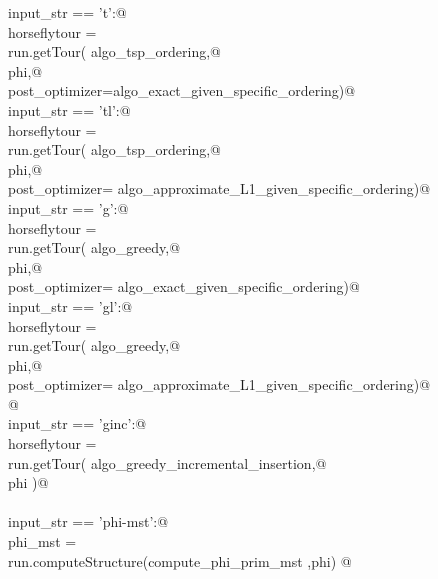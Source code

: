 \documentclass[11.5pt]{report}
\begin{document}
\begin{flushleft}
\begin{list}{}{}
\mbox{}\verb@elif input_str == 't':@\\
\mbox{}\verb@      horseflytour = \@\\
\mbox{}\verb@             run.getTour( algo_tsp_ordering,@\\
\mbox{}\verb@                          phi,@\\
\mbox{}\verb@                          post_optimizer=algo_exact_given_specific_ordering)@\\
\mbox{}\verb@elif input_str == 'tl':@\\
\mbox{}\verb@      horseflytour = \@\\
\mbox{}\verb@             run.getTour( algo_tsp_ordering,@\\
\mbox{}\verb@                          phi,@\\
\mbox{}\verb@                          post_optimizer= algo_approximate_L1_given_specific_ordering)@\\
\mbox{}\verb@elif input_str == 'g':@\\
\mbox{}\verb@      horseflytour = \@\\
\mbox{}\verb@             run.getTour( algo_greedy,@\\
\mbox{}\verb@                          phi,@\\
\mbox{}\verb@                          post_optimizer= algo_exact_given_specific_ordering)@\\
\mbox{}\verb@elif input_str == 'gl':@\\
\mbox{}\verb@      horseflytour = \@\\
\mbox{}\verb@             run.getTour( algo_greedy,@\\
\mbox{}\verb@                          phi,@\\
\mbox{}\verb@                          post_optimizer= algo_approximate_L1_given_specific_ordering)@\\
\mbox{}\verb@                          @\\
\mbox{}\verb@elif input_str == 'ginc':@\\
\mbox{}\verb@      horseflytour = \@\\
\mbox{}\verb@             run.getTour( algo_greedy_incremental_insertion,@\\
\mbox{}\verb@                          phi )@\\
\mbox{}\verb@@\\
\mbox{}\verb@elif input_str == 'phi-mst':@\\
\mbox{}\verb@      phi_mst = \@\\
\mbox{}\verb@             run.computeStructure(compute_phi_prim_mst ,phi)     @\\

\end{list}
\end{flushleft}
\end{document}

